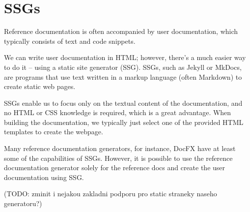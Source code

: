 \section{SSGs}

Reference documentation is often accompanied by user documentation, which typically consists of text and code snippets.

We can write user documentation in HTML; however, there's a much easier way to do it -- using a static site generator (SSG).
SSGs, such as Jekyll or MkDocs, are programs 
that use text written in a markup language (often Markdown) to create static web pages.

SSGs enable us to focus only on the textual content of the documentation, and no HTML or CSS knowledge is  required, which is a great advantage.
When building the documentation, we typically just select one of the provided HTML templates to create the webpage.

Many reference documentation generators, for instance, DocFX have at least some of the capabilities of SSGs. 
However, it is possible to use 
the reference documentation generator solely for the reference docs and
create the user documentation using SSG.

(TODO: zminit i nejakou zakladni podporu pro static straneky naseho generatoru?)
